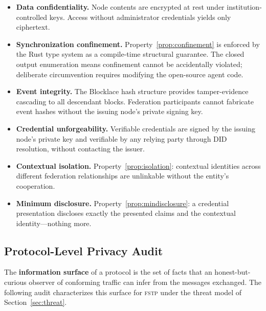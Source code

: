 \documentclass[12pt]{article}
\newcommand{\FSTP}{\textsc{fstp}}
\begin{document}
	\begin{itemize}[itemsep=4pt]
		
		\item \textbf{Data confidentiality.} Node contents are encrypted at
		rest under institution-controlled keys. Access without
		administrator credentials yields only ciphertext.
		
		\item \textbf{Synchronization confinement.}
		Property~\ref{prop:confinement} is enforced by the Rust type system
		as a compile-time structural guarantee. The closed output
		enumeration means confinement cannot be accidentally violated;
		deliberate circumvention requires modifying the open-source agent
		code.
		
		\item \textbf{Event integrity.} The Blocklace hash structure provides
		tamper-evidence cascading to all descendant blocks. Federation
		participants cannot fabricate event hashes without the issuing
		node's private signing key.
		
		\item \textbf{Credential unforgeability.} Verifiable credentials are
		signed by the issuing node's private key and verifiable by any
		relying party through DID resolution, without contacting the
		issuer.
		
		\item \textbf{Contextual isolation.} Property~\ref{prop:isolation}:
		contextual identities across different federation relationships are
		unlinkable without the entity's cooperation.
		
		\item \textbf{Minimum disclosure.} Property~\ref{prop:mindisclosure}:
		a credential presentation discloses exactly the presented claims and
		the contextual identity---nothing more.
		
	\end{itemize}
	
	\subsection{Protocol-Level Privacy Audit}
	\label{sec:privacyaudit}
	
	The \textbf{information surface} of a protocol is the set of facts
	that an honest-but-curious observer of conforming traffic can infer
	from the messages exchanged. The following audit characterizes this
	surface for \FSTP{} under the threat model of
	Section~\ref{sec:threat}.
	
\end{document}
